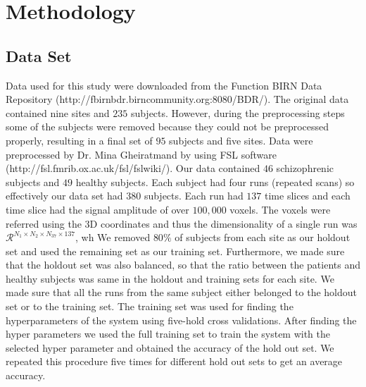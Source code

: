 \documentclass{article} %
\begin{document}
\section{Methodology}

\subsection{Data Set}
Data used for this study were downloaded from the Function BIRN Data 
Repository (http://fbirnbdr.birncommunity.org:8080/BDR/). The original 
data contained nine sites and $235$ subjects. However, during the 
preprocessing steps some of the subjects were removed because they could
not be preprocessed properly, resulting in a final set of $95$ 
subjects and five sites. Data were preprocessed by Dr. Mina Gheiratmand by 
using FSL software (http://fsl.fmrib.ox.ac.uk/fsl/fslwiki/). Our data 
contained $46$ schizophrenic subjects and $49$ healthy subjects. Each subject 
had four runs (repeated scans) so effectively our data set had $380$ subjects. Each run had 
$137$ time slices and each time slice had the signal amplitude of over 
$100,000$ voxels. The voxels were referred using the 3D coordinates and thus 
the dimensionality of a single run was 
$\mathcal R^{N_1 \times N_2 \times N_37 \times 137}$, wh
We removed $80\%$ of subjects from each site as our holdout set and used the 
remaining set as our training set. Furthermore, we made sure that the holdout 
set was also balanced, so that the ratio between the patients and healthy 
subjects was same in the holdout and training sets for each site. We made 
sure that all the runs from the same subject either belonged to the holdout 
set or to the training set. The training set was used for finding the 
hyperparameters of the system using five-hold cross validations. After finding 
the hyper parameters we used the full training set to train the system with 
the selected hyper parameter and obtained the accuracy of the hold out set. 
We repeated this procedure five times for different hold out sets 
to get an average accuracy. 
\end{document}
